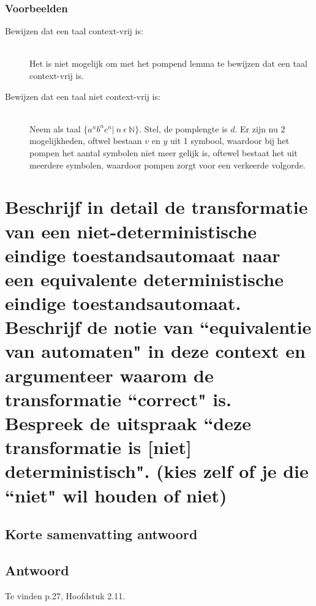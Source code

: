 \documentclass{article}
\begin{document}
        \subsubsection{Voorbeelden}
            \begin{description}
                \item[Bewijzen dat een taal context-vrij is:] \hfill  \\
                        Het is niet mogelijk om met het pompend lemma te bewijzen dat een taal context-vrij is.

                \item[Bewijzen dat een taal niet context-vrij is:] \hfill \\
                        Neem als taal $\{a^nb^nc^n \vert\  n\ \epsilon\ \mathbb{N} \}$. Stel, de pomplengte is $d$. Er zijn nu 2 mogelijkheden, oftwel bestaan $v$ en $y$ uit 1 symbool, waardoor bij het pompen het aantal symbolen niet meer gelijk is, oftewel bestaat het uit meerdere symbolen, waardoor pompen zorgt voor een verkeerde volgorde.
            \end{description}

\newpage
\section{Beschrijf in detail de transformatie van een niet-deterministische eindige toestandsautomaat naar een equivalente deterministische eindige toestandsautomaat. Beschrijf de notie van ``equivalentie van automaten" in deze context en argumenteer waarom de transformatie ``correct" is. Bespreek de uitspraak ``deze transformatie is [niet] deterministisch". (kies zelf of je die ``niet" wil houden of niet)}
    \subsection{Korte samenvatting antwoord}

    \subsection{Antwoord}
            Te vinden p.27, Hoofdstuk 2.11.
\end{document}
